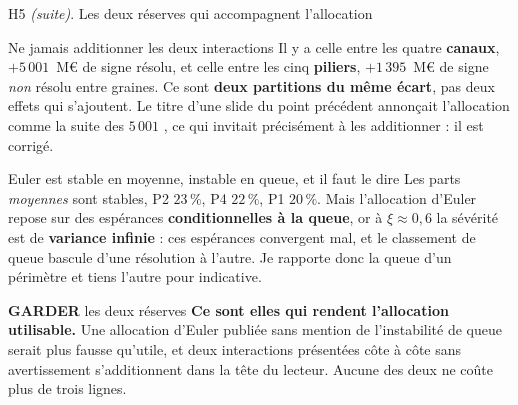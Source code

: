 \documentclass[11pt]{beamer}
\newcommand{\garder}{\textbf{GARDER}}
\newcommand{\srcs}[1]{\vspace{0.8mm}{\tiny\textcolor{gray!50!black}{Sources : #1}}}
\begin{document}
\begin{frame}{H5 \emph{(suite)}. Les deux réserves qui accompagnent l'allocation}
\scriptsize
\begin{block}{Ne jamais additionner les deux interactions}
Il y a celle entre les quatre \textbf{canaux}, $+5\,001$~M\euro{} de signe résolu, et celle
entre les cinq \textbf{piliers}, $+1\,395$~M\euro{} de signe \emph{non} résolu entre graines. Ce
sont \textbf{deux partitions du même écart}, pas deux effets qui s'ajoutent. Le titre d'une
slide du point précédent annonçait l'allocation comme \og la suite des $5\,001$ \fg, ce qui
invitait précisément à les additionner : il est corrigé.
\end{block}
\vspace{-1.5mm}
\begin{block}{Euler est stable en moyenne, instable en queue, et il faut le dire}
Les parts \emph{moyennes} sont stables, P2 $23\,\%$, P4 $22\,\%$, P1 $20\,\%$. Mais l'allocation
d'Euler repose sur des espérances \textbf{conditionnelles à la queue}, or à $\xi \approx 0{,}6$
la sévérité est de \textbf{variance infinie} : ces espérances convergent mal, et le classement
de queue bascule d'une résolution à l'autre. Je rapporte donc la queue d'un périmètre et tiens
l'autre pour indicative.
\end{block}
\vspace{-1.5mm}
\begin{block}{\garder{} les deux réserves}
\textbf{Ce sont elles qui rendent l'allocation utilisable.} Une allocation d'Euler publiée sans
mention de l'instabilité de queue serait plus fausse qu'utile, et deux interactions présentées
côte à côte sans avertissement s'additionnent dans la tête du lecteur. Aucune des deux ne coûte
plus de trois lignes.
\end{block}
\srcs{scripts~\texttt{20}, \texttt{20b} et~\texttt{68}}
\end{frame}
\end{document}

